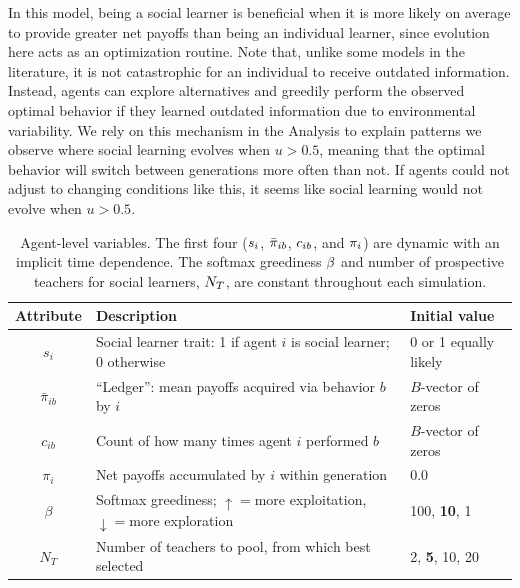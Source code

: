 \documentclass[letterpaper,11.5pt]{scrartcl}
\begin{document}
In this model, being a social learner is beneficial when it is more likely
on average to provide greater net payoffs than being an individual learner,
since evolution here acts as an optimization routine. 
Note that, unlike some models in the literature, it is not catastrophic for an 
individual to receive outdated information\cite[, e.g]{Rogers1988}. Instead,
agents can explore alternatives and greedily perform the observed optimal behavior
if they learned outdated information due to environmental variability. We rely
on this mechanism in the Analysis to explain patterns we observe where
social learning evolves when $u > 0.5$, meaning that the
optimal behavior will switch between generations more often than not. If 
agents could not adjust to changing conditions like this, it seems like 
social learning would not evolve when $u > 0.5$.


\begin{table}[h]
  \vspace{2em}
  \caption{Agent-level variables. The first four ($\protect s_i$, $\protect
    \bar\pi_{ib}$, $\protect c_{ib}$,
  and $\protect \pi_i$) are dynamic with an implicit time dependence. The softmax
greediness $\protect \beta$ and number of prospective teachers for social learners,
$\protect N_T$, are constant throughout each simulation.}
    \label{tab:modelParameters}
    \centering %
    \begin{tabular}{cp{4.0in}p{1.25in}} \toprule

        Attribute & Description & Initial value \\ 

        \midrule  

        $s_i$  & Social learner trait: 1 if agent $i$ is social learner; 0 otherwise & 0
        or 1 equally likely \\

        $\bar\pi_{ib}$ & ``Ledger'': mean payoffs acquired via behavior $b$ by $i$ 
                       & $B$-vector of zeros \\

        $c_{ib}$ & Count of how many times agent $i$ performed $b$ 
              & $B$-vector of zeros \\

        $\pi_i$ & Net payoffs accumulated by $i$ within generation & 0.0 \\

        $\beta$ & Softmax greediness; $\uparrow=$more exploitation, $\downarrow=$more
                    exploration 
               & 100, \textbf{10}, 1 \\
        
        $N_T$    & Number of teachers to pool, from which best selected 
                 & 2, \textbf{5}, 10, 20  \\

        \bottomrule
    \end{tabular}
\end{table}
\end{document}
